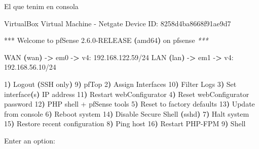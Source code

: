 \documentclass[
  10pt,
]{krantz}
\newenvironment{Shaded}{\begin{snugshade}}{\end{snugshade}}
\newcommand{\AttributeTok}[1]{\textcolor[rgb]{0.77,0.63,0.00}{#1}}
\newcommand{\ErrorTok}[1]{\textcolor[rgb]{0.64,0.00,0.00}{\textbf{#1}}}
\newcommand{\ExtensionTok}[1]{#1}
\newcommand{\KeywordTok}[1]{\textcolor[rgb]{0.13,0.29,0.53}{\textbf{#1}}}
\newcommand{\NormalTok}[1]{#1}
\newcommand{\OperatorTok}[1]{\textcolor[rgb]{0.81,0.36,0.00}{\textbf{#1}}}
\newcommand{\PreprocessorTok}[1]{\textcolor[rgb]{0.56,0.35,0.01}{\textit{#1}}}
\begin{document}
El que tenim en consola

\begin{Shaded}
\begin{Highlighting}[]
\ExtensionTok{VirtualBox}\NormalTok{ Virtual Machine }\AttributeTok{{-}}\NormalTok{ Netgate Device ID: 8258d4ba8668f91ae9d7}

\ExtensionTok{***}\NormalTok{ Welcome to pfSense 2.6.0{-}RELEASE }\ErrorTok{(}\ExtensionTok{amd64}\KeywordTok{)} \ExtensionTok{on}\NormalTok{ pfsense }\PreprocessorTok{***}

 \ExtensionTok{WAN} \ErrorTok{(}\ExtensionTok{wan}\KeywordTok{)}       \ExtensionTok{{-}}\OperatorTok{\textgreater{}}\NormalTok{ em0        }\AttributeTok{{-}}\OperatorTok{\textgreater{}}\NormalTok{ v4: 192.168.122.59/24}
 \ExtensionTok{LAN} \ErrorTok{(}\ExtensionTok{lan}\KeywordTok{)}       \ExtensionTok{{-}}\OperatorTok{\textgreater{}}\NormalTok{ em1        }\AttributeTok{{-}}\OperatorTok{\textgreater{}}\NormalTok{ v4: 192.168.56.10/24}

 \ExtensionTok{1}\ErrorTok{)} \ExtensionTok{Logout} \ErrorTok{(}\ExtensionTok{SSH}\NormalTok{ only}\KeywordTok{)}                  \ExtensionTok{9}\ErrorTok{)} \ExtensionTok{pfTop}
 \ExtensionTok{2}\ErrorTok{)} \ExtensionTok{Assign}\NormalTok{ Interfaces                 10}\ErrorTok{)} \ExtensionTok{Filter}\NormalTok{ Logs}
 \ExtensionTok{3}\ErrorTok{)} \ExtensionTok{Set}\NormalTok{ interface}\ErrorTok{(}\ExtensionTok{s}\KeywordTok{)} \ExtensionTok{IP}\NormalTok{ address       11}\ErrorTok{)} \ExtensionTok{Restart}\NormalTok{ webConfigurator}
 \ExtensionTok{4}\ErrorTok{)} \ExtensionTok{Reset}\NormalTok{ webConfigurator password    12}\ErrorTok{)} \ExtensionTok{PHP}\NormalTok{ shell + pfSense tools}
 \ExtensionTok{5}\ErrorTok{)} \ExtensionTok{Reset}\NormalTok{ to factory defaults         13}\ErrorTok{)} \ExtensionTok{Update}\NormalTok{ from console}
 \ExtensionTok{6}\ErrorTok{)} \ExtensionTok{Reboot}\NormalTok{ system                     14}\ErrorTok{)} \ExtensionTok{Disable}\NormalTok{ Secure Shell }\ErrorTok{(}\ExtensionTok{sshd}\KeywordTok{)}
 \ExtensionTok{7}\ErrorTok{)} \ExtensionTok{Halt}\NormalTok{ system                       15}\ErrorTok{)} \ExtensionTok{Restore}\NormalTok{ recent configuration}
 \ExtensionTok{8}\ErrorTok{)} \ExtensionTok{Ping}\NormalTok{ host                         16}\ErrorTok{)} \ExtensionTok{Restart}\NormalTok{ PHP{-}FPM}
 \ExtensionTok{9}\ErrorTok{)} \ExtensionTok{Shell}

\ExtensionTok{Enter}\NormalTok{ an option: }
\end{Highlighting}
\end{Shaded}
\end{document}
